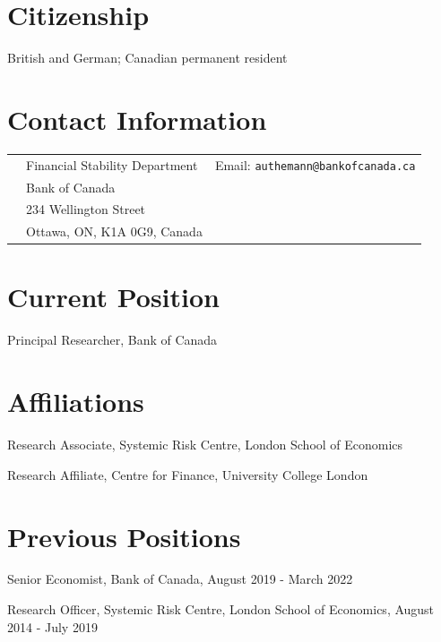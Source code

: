 \documentclass[margin,line, 11pt]{res}
\newenvironment{list1}{
  \begin{list}{\ding{113}}{%
      \setlength{\itemsep}{0in}
      \setlength{\parsep}{0in} \setlength{\parskip}{0in}
      \setlength{\topsep}{0in} \setlength{\partopsep}{0in} 
      \setlength{\leftmargin}{0.17in}}}{\end{list}}
\begin{document}

\begin{resume}
\thispagestyle{plain} %

\section{\sc Citizenship}
\begin{list1}
\item[] British and German; Canadian permanent resident 
\end{list1}

\section{\sc Contact Information}
\vspace{.05in}
\begin{tabular}{@{}p{0.20in}p{2.4in}p{2.75in}}
 & Financial Stability Department  &  Email:
\texttt{authemann@bankofcanada.ca} \\
 & Bank of Canada   &  \\
 & 234 Wellington Street \\       
 & Ottawa, ON, K1A 0G9, Canada
\end{tabular}


\section{\sc Current Position}
\begin{list1}
\item[] Principal Researcher, Bank of Canada
\end{list1}

\section{\sc Affiliations}
\begin{list1}
\item[] Research Associate, Systemic Risk Centre, London School of Economics
\item[] Research Affiliate, Centre for Finance, University College London
\end{list1}

\section{\sc Previous Positions}
\begin{list1}
\item[] Senior Economist, Bank of Canada, August 2019 - March 2022
\item[] Research Officer, Systemic Risk Centre, London School of Economics, August 2014 - July 2019
\end{list1}


\end{resume}
\end{document}

